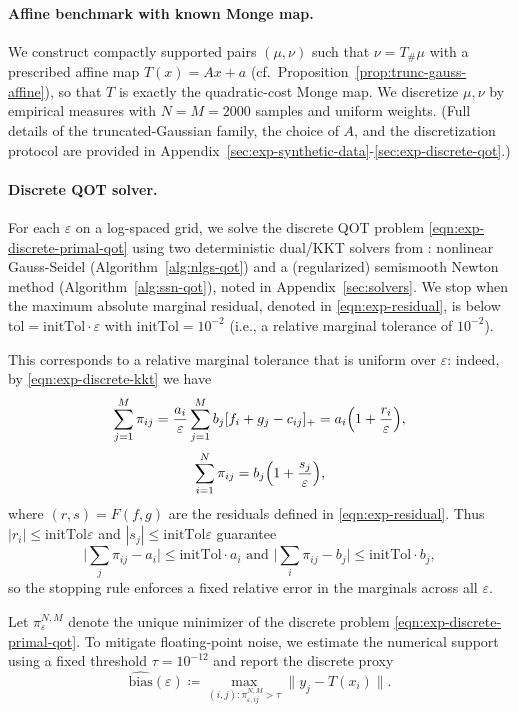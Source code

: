 \documentclass{article}
\theoremstyle{plain}
\theoremstyle{definition}
\theoremstyle{remark}
\numberwithin{equation}{section}
\begin{document}
\paragraph{Affine benchmark with known Monge map.}
We construct compactly supported pairs $(\mu,\nu)$ such that $\nu=T_\#\mu$ with a prescribed affine map $T(x)=Ax+a$ (cf.\ Proposition~\ref{prop:trunc-gauss-affine}), so that $T$ is exactly the quadratic-cost Monge map.
We discretize $\mu,\nu$ by empirical measures with $N=M=2000$ samples and uniform weights.
(Full details of the truncated-Gaussian family, the choice of $A$, and the discretization protocol are provided in Appendix~\ref{sec:exp-synthetic-data}-\ref{sec:exp-discrete-qot}.)

\paragraph{Discrete QOT solver.}
For each $\varepsilon$ on a log-spaced grid, we solve the discrete QOT problem \eqref{eqn:exp-discrete-primal-qot} using two deterministic dual/KKT solvers from \citet{lorenz2021quadratically}: nonlinear Gauss-Seidel (Algorithm~\ref{alg:nlgs-qot}) and a (regularized) semismooth Newton method (Algorithm~\ref{alg:ssn-qot}), noted in Appendix~\ref{sec:solvers}.
We stop when the maximum absolute marginal residual, denoted in \eqref{eqn:exp-residual}, is below $\mathrm{tol}=\mathrm{initTol}\cdot\varepsilon$ with $\mathrm{initTol}=10^{-2}$ (i.e., a relative marginal tolerance of $10^{-2}$).

This corresponds to a relative marginal tolerance that is uniform over $\varepsilon$: indeed, by \eqref{eqn:exp-discrete-kkt} we have
$$
\sum_{j=1}^M\pi_{ij}=\frac{a_i}{\varepsilon}\sum_{j=1}^Mb_j[f_i+g_j-c_{ij}]_+=a_i\Bigl(1+\frac{r_i}{\varepsilon}\Bigr),
$$
$$
\sum_{i=1}^N\pi_{ij}=b_j\Bigl(1+\frac{s_j}{\varepsilon}\Bigr),
$$
where $(r,s)=F(f,g)$ are the residuals defined in \eqref{eqn:exp-residual}.
Thus $|r_i|\le\mathrm{initTol}\varepsilon$ and $|s_j|\le\mathrm{initTol}\varepsilon$ guarantee
$$
\bigl|\sum_j\pi_{ij}-a_i\bigr|\le\mathrm{initTol}\cdot a_i\text{ and }\bigl|\sum_i\pi_{ij}-b_j\bigr|\le\mathrm{initTol}\cdot b_j,
$$
so the stopping rule enforces a fixed relative error in the marginals across all $\varepsilon$.


Let $\pi_\varepsilon^{N,M}$ denote the unique minimizer of the discrete problem \eqref{eqn:exp-discrete-primal-qot}.
To mitigate floating-point noise, we estimate the numerical support using a fixed threshold $\tau=10^{-12}$ and report the discrete proxy
$$
\widehat{\mathrm{bias}}(\varepsilon)\coloneqq \max_{(i,j):\pi^{N,M}_{\varepsilon,ij}>\tau}\|y_j-T(x_i)\|.
$$
\end{document}
